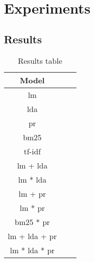 \section{Experiments}\label{sec:experiment}


\subsection{Results}\label{subsec:results}

\begin{table}[h]
	\centering
	\caption{Results table}
	\begin{tabular}{c|c|c}
		Model & & \\
		\midrule
		\gls{lm} & & \\  
		\gls{lda} & & \\
		\gls{pr} & & \\
		\gls{bm25} & & \\
		\gls{tf-idf} & & \\
		\gls{lm} + \gls{lda} & & \\
		\gls{lm} * \gls{lda} & & \\
		\gls{lm} + \gls{pr} & & \\
		\gls{lm} * \gls{pr} & & \\
		\gls{bm25} * \gls{pr} & & \\
		\gls{lm} + \gls{lda} + \gls{pr} & & \\
		\gls{lm} * \gls{lda} * \gls{pr} & & \\
	\end{tabular}
	
	\label{tab:results}
\end{table}